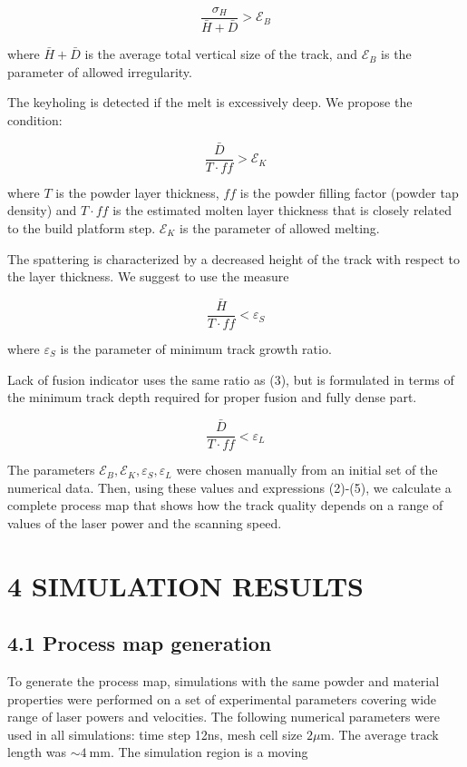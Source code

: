 \documentclass[10pt]{article}
\begin{document}
\begin{equation*}
\frac{\sigma_{H}}{\bar{H}+\bar{D}}>\mathcal{E}_{B} \tag{2}
\end{equation*}


where $\bar{H}+\bar{D}$ is the average total vertical size of the track, and $\mathcal{E}_{B}$ is the parameter of allowed irregularity.

The keyholing is detected if the melt is excessively deep. We propose the condition:


\begin{equation*}
\frac{\bar{D}}{T \cdot f f}>\mathcal{E}_{K} \tag{3}
\end{equation*}


where $T$ is the powder layer thickness, $f f$ is the powder filling factor (powder tap density) and $T \cdot f f$ is the estimated molten layer thickness that is closely related to the build platform step. $\mathcal{E}_{K}$ is the parameter of allowed melting.

The spattering is characterized by a decreased height of the track with respect to the layer thickness. We suggest to use the measure


\begin{equation*}
\frac{\bar{H}}{T \cdot f f}<\varepsilon_{S} \tag{4}
\end{equation*}


where $\varepsilon_{S}$ is the parameter of minimum track growth ratio.

Lack of fusion indicator uses the same ratio as (3), but is formulated in terms of the minimum track depth required for proper fusion and fully dense part.


\begin{equation*}
\frac{\bar{D}}{T \cdot f f}<\varepsilon_{L} \tag{5}
\end{equation*}


The parameters $\mathcal{E}_{B}, \mathcal{E}_{K}, \varepsilon_{S}, \varepsilon_{L}$ were chosen manually from an initial set of the numerical data. Then, using these values and expressions (2)-(5), we calculate a complete process map that shows how the track quality depends on a range of values of the laser power and the scanning speed.

\section*{4 SIMULATION RESULTS}
\subsection*{4.1 Process map generation}
To generate the process map, simulations with the same powder and material properties were performed on a set of experimental parameters covering wide range of laser powers and velocities. The following numerical parameters were used in all simulations: time step 12ns, mesh cell size $2 \mu \mathrm{m}$. The average track length was $\sim 4 \mathrm{~mm}$. The simulation region is a moving
\end{document}
